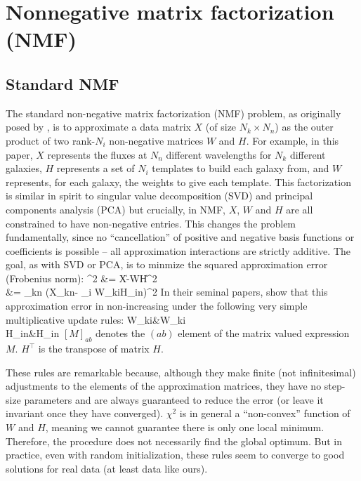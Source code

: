 \documentclass[10pt,preprint]{aastex}
\def\beqa#1\eeqa{\begin{align}#1\end{align}}
\newcommand{\T}{^{\scriptscriptstyle \top}}
\newcommand{\XX}{X}
\newcommand{\XXh}{\hat{X}}
\newcommand{\Xkn}{X_{kn}}
\newcommand{\WW}{W}
\newcommand{\Wki}{W_{ki}}
\newcommand{\HH}{H}
\newcommand{\Hin}{H_{in}}
\begin{document}
\appendix

\section{Nonnegative matrix factorization (NMF)}
\label{nmf}

\subsection{Standard NMF}
The standard non-negative matrix factorization (NMF) problem, as
originally posed by \cite{lee00a}, is to approximate a data
matrix $\XX$ (of size $N_k\times N_n$) as the outer product of two
rank-$N_i$ non-negative matrices $\WW$ and $\HH$. For example, in this
paper, $\XX$ represents the fluxes at $N_n$ different wavelengths for
$N_k$ different galaxies, $\HH$ represents a set of $N_i$ templates to build
each galaxy from, and $\WW$ represents, for each galaxy, the weights
to give each template. This factorization is similar in spirit to
singular value decomposition (SVD) and principal components analysis
(PCA) but crucially, in NMF, $\XX$, $\WW$ and $\HH$ are all
constrained to have non-negative entries. This changes the problem
fundamentally, since no ``cancellation'' of positive and negative
basis functions or coefficients is possible -- all approximation
interactions are strictly additive. The goal, as with SVD or PCA, is
to minmize the squared approximation error (Frobenius norm):
\beqa \label{eq:nmfcost}
\chi^2 &= \|\XX-\WW\HH\|^2\\
&= \sum_{kn} \left(\Xkn - \sum_i \Wki\Hin \right)^2
\eeqa
In their seminal papers, \cite{lee00a} show that this approximation
error in non-increasing under the following very simple multiplicative
update rules: 
\beqa \label{eq:wupdate}
\Wki &\leftarrow \Wki \frac{[\XX\HH\T]_{ki}}{[\WW\HH\HH\T]_{ki}}\\
\label{eq:hupdate}
\Hin &\leftarrow \Hin \frac{[\WW\T\XX]_{in}}{[\WW\T\WW\HH]_{in}}
\eeqa
$[M]_{ab}$ denotes the $(ab)$ element of the matrix valued expression
$M$. $\HH\T$ is the transpose of matrix $\HH$.

These rules are remarkable because, although they make finite (not
infinitesimal) adjustments to the elements of the approximation
matrices, they have no step-size parameters and are always guaranteed
to reduce the error (or leave it invariant once they have converged).
$\chi^2$ is in general a ``non-convex'' function of $\WW$ and $\HH$,
meaning we cannot guarantee there is only one local
minimum. Therefore, the procedure does not necessarily find the global
optimum. But in practice, even with random initialization, these rules
seem to converge to good solutions for real data (at least data like
ours).
\end{document}

